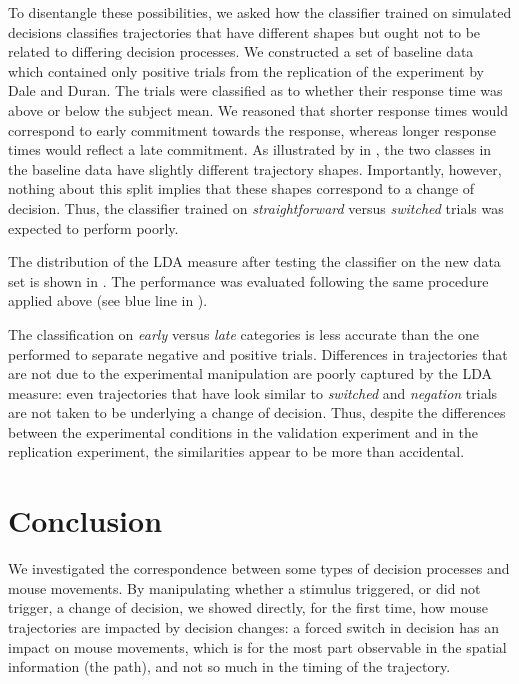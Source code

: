\documentclass[11pt]{article}
\begin{document}
To disentangle these possibilities, we asked how the classifier trained on simulated decisions classifies trajectories that have different shapes but ought not to be related to differing decision processes.
We  constructed a set of baseline data which contained only positive trials from the replication of the experiment by Dale and Duran. The trials were classified as to whether their response time was above or below the subject mean. We reasoned that shorter response times would correspond to early commitment towards the response, whereas longer response times would reflect a late commitment. As illustrated by in , the two classes in the baseline data have slightly different trajectory shapes. Importantly, however, nothing about this split implies that these shapes correspond to a change of decision. Thus, the classifier trained on \emph{straightforward} versus \emph{switched} trials was expected to perform poorly.

The distribution of the LDA measure after testing the classifier on the new data set is shown in . The performance was evaluated following the same procedure applied above (see blue line in ). 

The classification on \emph{early} versus \emph{late} categories is less accurate than the one performed to separate negative and positive trials.
Differences in trajectories that are not due to the experimental manipulation are poorly captured by the LDA measure: even trajectories that  have look similar to \emph{switched} and \emph{negation} trials are not taken to be underlying a change of decision. 
Thus, despite the differences between the experimental conditions in the validation experiment and in the replication experiment, the similarities appear to be more than accidental.

\section{Conclusion}
We investigated the correspondence between some types of decision processes and mouse movements.
By manipulating whether a stimulus triggered, or did not trigger, a change of decision, we showed directly, for the first time, how mouse trajectories are impacted by decision changes: a forced switch in decision has an impact on mouse movements, which is for the most part observable in the spatial information (the path), and not so much in the timing of the trajectory. 
\end{document}
